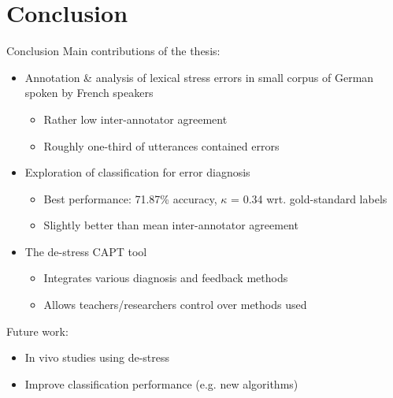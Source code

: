 \documentclass[xcolor={dvipsnames}]{beamer}
\begin{document}
\section{Conclusion}
		\begin{frame}{Conclusion}
		Main contributions of the thesis:
		\begin{itemize}
		\pause
		\item Annotation \& analysis of lexical stress errors in small corpus of German spoken by French speakers
			\begin{itemize}
			\item Rather low inter-annotator agreement
			\item Roughly one-third of utterances contained errors
			\end{itemize}
			
		\pause
		\item Exploration of classification for error diagnosis
			\begin{itemize}
			\item Best performance: 71.87\% accuracy, $\kappa$ = 0.34 wrt. gold-standard labels
			\item Slightly better than mean inter-annotator agreement
			\end{itemize}
		
		\pause
		\item The de-stress CAPT tool
			\begin{itemize}
			\item Integrates various diagnosis and feedback methods
			\item Allows teachers/researchers control over methods used
			\end{itemize}
		\end{itemize}
		\pause
		\vfill
		Future work:
		\begin{itemize}
			\item In vivo studies using de-stress
			\item Improve classification performance (e.g. new algorithms)
		\end{itemize}
		\end{frame}

%	
\end{document}
